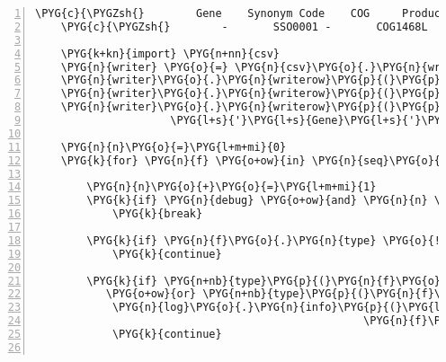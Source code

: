 \begin{Verbatim}[commandchars=\\\{\},numbers=left,firstnumber=1,stepnumber=5]
    \PYG{c}{\PYGZsh{}        Gene    Synonym Code    COG     Product}
    \PYG{c}{\PYGZsh{}        -       SSO0001 -       COG1468L        hypothetical protein}

    \PYG{k+kn}{import} \PYG{n+nn}{csv}
    \PYG{n}{writer} \PYG{o}{=} \PYG{n}{csv}\PYG{o}{.}\PYG{n}{writer}\PYG{p}{(}\PYG{n}{out\PYGZus{}file}\PYG{p}{,} \PYG{n}{delimiter}\PYG{o}{=}\PYG{l+s}{'}\PYG{l+s+se}{\PYGZbs{}t}\PYG{l+s}{'}\PYG{p}{,} \PYG{n}{lineterminator}\PYG{o}{=}\PYG{l+s}{'}\PYG{l+s+se}{\PYGZbs{}n}\PYG{l+s}{'}\PYG{p}{)}
    \PYG{n}{writer}\PYG{o}{.}\PYG{n}{writerow}\PYG{p}{(}\PYG{p}{(}\PYG{n}{seq}\PYG{o}{.}\PYG{n}{description}\PYG{p}{,}\PYG{p}{)}\PYG{p}{)}
    \PYG{n}{writer}\PYG{o}{.}\PYG{n}{writerow}\PYG{p}{(}\PYG{p}{(}\PYG{p}{)}\PYG{p}{)}
    \PYG{n}{writer}\PYG{o}{.}\PYG{n}{writerow}\PYG{p}{(}\PYG{p}{(}\PYG{l+s}{'}\PYG{l+s}{Location}\PYG{l+s}{'}\PYG{p}{,} \PYG{l+s}{'}\PYG{l+s}{Strand}\PYG{l+s}{'}\PYG{p}{,} \PYG{l+s}{'}\PYG{l+s}{Length}\PYG{l+s}{'}\PYG{p}{,} \PYG{l+s}{'}\PYG{l+s}{PID}\PYG{l+s}{'}\PYG{p}{,}
                     \PYG{l+s}{'}\PYG{l+s}{Gene}\PYG{l+s}{'}\PYG{p}{,} \PYG{l+s}{'}\PYG{l+s}{Synonym}\PYG{l+s}{'}\PYG{p}{,} \PYG{l+s}{'}\PYG{l+s}{Code}\PYG{l+s}{'}\PYG{p}{,} \PYG{l+s}{'}\PYG{l+s}{COG}\PYG{l+s}{'}\PYG{p}{,} \PYG{l+s}{'}\PYG{l+s}{Product}\PYG{l+s}{'}\PYG{p}{)}\PYG{p}{)}

    \PYG{n}{n}\PYG{o}{=}\PYG{l+m+mi}{0}
    \PYG{k}{for} \PYG{n}{f} \PYG{o+ow}{in} \PYG{n}{seq}\PYG{o}{.}\PYG{n}{features}\PYG{p}{:}

        \PYG{n}{n}\PYG{o}{+}\PYG{o}{=}\PYG{l+m+mi}{1}
        \PYG{k}{if} \PYG{n}{debug} \PYG{o+ow}{and} \PYG{n}{n} \PYG{o}{\textgreater{}} \PYG{l+m+mi}{10}\PYG{p}{:}
            \PYG{k}{break}

        \PYG{k}{if} \PYG{n}{f}\PYG{o}{.}\PYG{n}{type} \PYG{o}{!=} \PYG{l+s}{'}\PYG{l+s}{CDS}\PYG{l+s}{'}\PYG{p}{:}
            \PYG{k}{continue}

        \PYG{k}{if} \PYG{n+nb}{type}\PYG{p}{(}\PYG{n}{f}\PYG{o}{.}\PYG{n}{location}\PYG{o}{.}\PYG{n}{start}\PYG{p}{)} \PYG{o}{!=} \PYG{n}{ExactPosition} \PYGZbs{}
           \PYG{o+ow}{or} \PYG{n+nb}{type}\PYG{p}{(}\PYG{n}{f}\PYG{o}{.}\PYG{n}{location}\PYG{o}{.}\PYG{n}{end}\PYG{p}{)} \PYG{o}{!=} \PYG{n}{ExactPosition}\PYG{p}{:}
            \PYG{n}{log}\PYG{o}{.}\PYG{n}{info}\PYG{p}{(}\PYG{l+s}{"}\PYG{l+s}{skipping non-exact location }\PYG{l+s}{'}\PYG{l+s+si}{\PYGZpc{}s}\PYG{l+s}{'}\PYG{l+s}{ in }\PYG{l+s}{'}\PYG{l+s+si}{\PYGZpc{}s}\PYG{l+s}{'}\PYG{l+s}{"} \PYG{o}{\PYGZpc{}} \PYG{p}{(}
                                                   \PYG{n}{f}\PYG{o}{.}\PYG{n}{location}\PYG{p}{,} \PYG{n}{f}\PYG{o}{.}\PYG{n}{type}\PYG{p}{)}\PYG{p}{)}
            \PYG{k}{continue}


\end{Verbatim}
